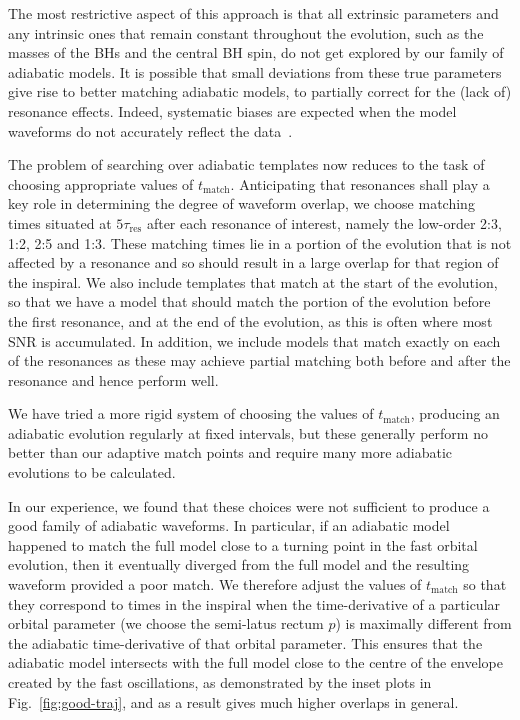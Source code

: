 \documentclass[aps,prd,amsfonts,amssymb,amsmath,nofootinbib,reprint,showpacs,superscriptaddress,twocolumn]{revtex4}
\newcommand{\figref}[1]{Fig.\ \ref{fig:#1}}
\begin{document}
The most restrictive aspect of this approach is that all extrinsic parameters and any intrinsic ones that remain constant throughout the evolution, such as the masses of the BHs and the central BH spin, do not get explored by our family of adiabatic models. It is possible that small deviations from these true parameters give rise to better matching adiabatic models, to partially correct for the (lack of) resonance effects. Indeed, systematic biases are expected when the model waveforms do not accurately reflect the data~\cite{Cutler2007}.

The problem of searching over adiabatic templates now reduces to the task of choosing appropriate values of $t_{\mathrm{match}}$. Anticipating that resonances shall play a key role in determining the degree of waveform overlap, we choose matching times situated at $5\tau_\mathrm{res}$ after each resonance of interest, namely the low-order 2:3, 1:2, 2:5 and 1:3. These matching times lie in a portion of the evolution that is not affected by a resonance and so should result in a large overlap for that region of the inspiral. We also include templates that match at the start of the evolution, so that we have a model that should match the portion of the evolution before the first resonance, and at the end of the evolution, as this is often where most SNR is accumulated. In addition, we include models that match exactly on each of the resonances as these may achieve partial matching both before and after the resonance and hence perform well.

We have tried a more rigid system of choosing the values of $t_{\mathrm{match}}$, producing an adiabatic evolution regularly at fixed intervals, but these generally perform no better than our adaptive match points and require many more adiabatic evolutions to be calculated.

In our experience, we found that these choices were not sufficient to produce a good family of adiabatic waveforms. In particular, if an adiabatic model happened to match the full model close to a turning point in the fast orbital evolution, then it eventually diverged from the full model and the resulting waveform provided a poor match. We therefore adjust the values of $t_{\mathrm{match}}$ so that they correspond to times in the inspiral when the time-derivative of a particular orbital parameter (we choose the semi-latus rectum $p$) is maximally different from the adiabatic time-derivative of that orbital parameter. This ensures that the adiabatic model intersects with the full model close to the centre of the envelope created by the fast oscillations, as demonstrated by the inset plots in \figref{good-traj}, and as a result gives much higher overlaps in general.
\end{document}
